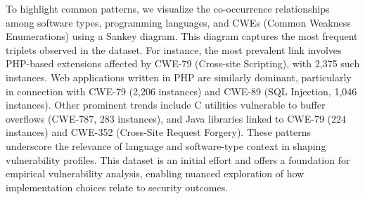 To highlight common patterns, we visualize the co-occurrence relationships among software types, programming languages, and CWEs (Common Weakness Enumerations) using a Sankey diagram. This diagram captures the most frequent triplets observed in the dataset. For instance, the most prevalent link involves PHP-based extensions affected by CWE-79 (Cross-site Scripting), with 2,375 such instances. Web applications written in PHP are similarly dominant, particularly in connection with CWE-79 (2,206 instances) and CWE-89 (SQL Injection, 1,046 instances). Other prominent trends include C utilities vulnerable to buffer overflows (CWE-787, 283 instances), and Java libraries linked to CWE-79 (224 instances) and CWE-352 (Cross-Site Request Forgery). These patterns underscore the relevance of language and software-type context in shaping vulnerability profiles. This dataset is an initial effort and offers a foundation for empirical vulnerability analysis, enabling nuanced exploration of how implementation choices relate to security outcomes.



